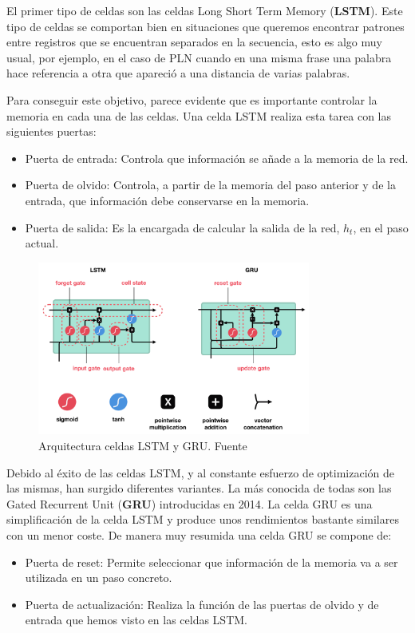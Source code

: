 El primer tipo de celdas  son las celdas Long Short Term Memory (\textbf{LSTM}). Este tipo de celdas se comportan bien en situaciones que queremos encontrar patrones entre registros que se encuentran separados en la secuencia, esto es algo muy usual, por ejemplo, en el caso de PLN cuando en una misma frase una palabra hace referencia a otra que apareció a una distancia de varias palabras. 
	
Para conseguir este objetivo, parece evidente que es importante controlar la memoria en cada una de las celdas. Una celda LSTM realiza esta tarea con las siguientes puertas: 
	\begin{itemize}
		\item Puerta de entrada: Controla que información se añade a la memoria de la red. 
		\item Puerta de olvido: Controla, a partir de la memoria del paso anterior y de la entrada, que información debe conservarse en la memoria. 
		\item Puerta de salida:  Es la encargada de calcular la salida de la red, $h_{t}$, en el paso actual. 
	\end{itemize}

\begin{figure}[!ht]
	\centering
	\includegraphics[width=0.8\textwidth]{images/arte/lstmvsgru}
	\caption{Arquitectura celdas LSTM y GRU. Fuente \cite{lstmgru}}
	\label{fig:lstmvsgru}
\end{figure}



Debido al éxito de las celdas LSTM, y al constante esfuerzo de optimización de las mismas, han surgido diferentes variantes. La más conocida de todas son las Gated Recurrent Unit (\textbf{GRU}) introducidas en 2014. La celda GRU es una simplificación de la celda LSTM y produce unos rendimientos bastante similares con un menor coste. De manera muy resumida una celda GRU se compone de: 
\begin{itemize}
	\item Puerta de reset: Permite seleccionar que información de la memoria va a ser utilizada en un paso concreto. 
	\item Puerta de actualización: Realiza la función de las puertas de olvido y de entrada que hemos visto en las celdas LSTM.
\end{itemize}

